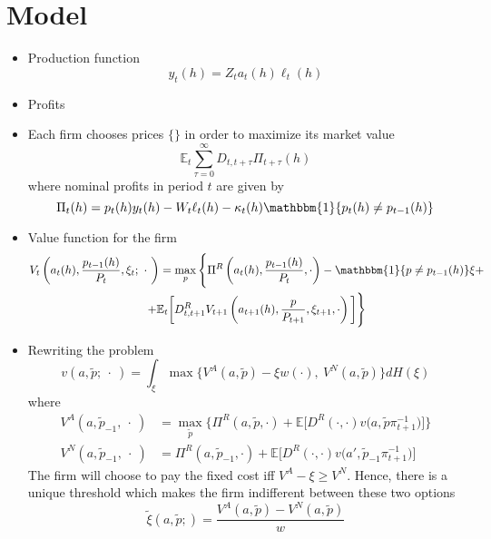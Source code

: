 \documentclass[a4paper,10pt]{article}  %
\begin{document}
\section{Model} %
\label{sec:model}
\begin{itemize}
   \item Production function
   \begin{equation}
      \label{eq:model_eq1}
      y_t(h) = Z_t a_t(h) \ell_t(h)
   \end{equation}

   \item Profits
   
   \item Each firm chooses prices $ \{\} $ in order to maximize its market value
   \begin{equation}
      \label{eq:model_eq}
      \mathbb{E}_t \sum_{\tau=0}^{\infty} D_{t,t+\tau} \Pi_{t+\tau} (h)
   \end{equation}
   where nominal profits in period $ t $ are given by
   \begin{equation}
      \label{eq:model_eq3}
      \Pi_t(h) = p_t(h) y_t(h) - W_t \ell_t(h) - \kappa_t(h) \mathbbm{1}\{p_t(h) \ne p_{t-1}(h)\}
   \end{equation}
   \item Value function for the firm
   \begin{multline}
      V_t \left( a_t(h), \frac{ p_{t-1}(h) }{ P_t }, \xi_t; \ \cdot \ \right) = 
      \max_{p} 
      \Bigg\{
         \Pi^R \left( a_t(h), \frac{ p_{t-1}(h) }{ P_t }, \cdot \right) 
         -\mathbbm{1} \{p \ne p_{t-1}(h ) \} \xi + \\
         + \mathbb{E}_t \bigg[ D^R_{t,t+1} V_{t+1} \left( a_{t+1}(h), \frac{ p }{ P_{t+1} }, \xi_{t+1}, \cdot \right) \bigg] \Bigg\}
   \end{multline}

   \item Rewriting the problem
   \[
      v(a, \tilde{p}; \ \cdot \ ) = \int_{\xi} \max \Big\{ V^A(a,\tilde{p} ) - \xi w(\cdot) , \ V^N(a,\tilde{p} )  \Big\} dH(\xi )
   \]
   where
   \begin{equation}
      \label{eq:model_eq4}
      \begin{split}
      V^A(a, \tilde{p}_{-1}, \ \cdot \ ) & = \max_{\tilde{p}} 
         \Bigg\{ 
            \Pi^R \left( a, \tilde{p}, \cdot \right) + 
            \mathbb{E} \bigg[ D^R(\cdot,\cdot) v\Big( a,\tilde{p} \pi_{t+1}^{-1} \Big) \bigg]
         \Bigg\} \\
      V^N(a, \tilde{p}_{-1}, \ \cdot \ ) & = 
          \Pi^R \left( a, \tilde{p}_{-1}, \cdot \right) + \mathbb{E}
          \Big[ 
               D^R(\cdot,\cdot) v\Big( a', \tilde{p}_{-1}\pi_{t+1}^{-1} \Big)
          \Big]
      \end{split}
   \end{equation}
   The firm will choose to pay the fixed cost iff $ V^A -\xi \ge V^N $. Hence,
   there is a unique threshold which makes the firm indifferent between these
   two options
   \[
      \tilde{\xi}(a, \tilde{p} ; ) = \frac{V^A(a, \tilde{p} ) - V^N( a, \tilde{p})}{w}
   \]


\end{itemize}
\end{document}
